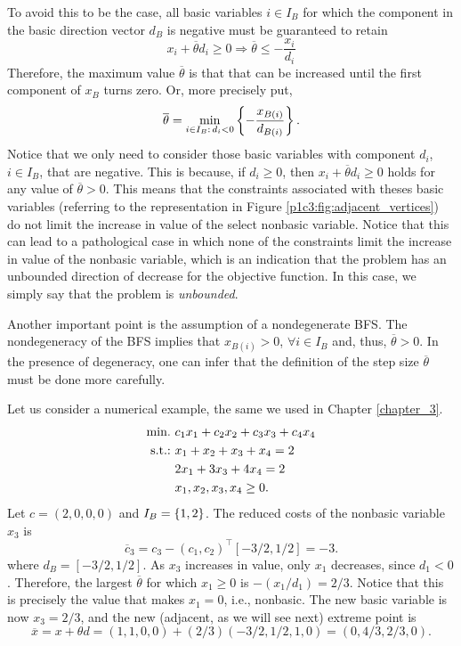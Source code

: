 To avoid this to be the case, all basic variables $i \in I_B$ for which the component in the basic direction vector $d_B$ is negative must be guaranteed to retain
%
\begin{equation*}
	x_i + \overline{\theta}d_i \geq 0 \Rightarrow \overline{\theta} \leq -\frac{x_i}{d_i}
\end{equation*}
%
Therefore, the maximum value $\overline{\theta}$ is that that can be increased until the first component of $x_B$ turns zero. Or, more precisely put, 
%
\begin{equation*}
	\overline{\theta} = \min_{i \in I_B : \, d_i < 0} \left\{ -\frac{x_{B(i)}}{d_{B(i)}} \right \}.
\end{equation*}
%
Notice that we only need to consider those basic variables with component $d_i$, $i \in I_B$, that are negative. This is because, if $d_i \ge 0$, then $x_i + \overline{\theta}d_i \geq 0$ holds for any value of $\overline{\theta} > 0$. This means that the constraints associated with theses basic variables (referring to the representation in Figure \ref{p1c3:fig:adjacent_vertices}) do not limit the increase in value of the select nonbasic variable. Notice that this can lead to a pathological case in which none of the constraints limit the increase in value of the nonbasic variable, which is an indication that the problem has an unbounded direction of decrease for the objective function. In this case, we simply say that the problem is \emph{unbounded}.

Another important point is the assumption of a nondegenerate BFS. The nondegeneracy of the BFS implies that  $x_{B(i)} > 0$, $\forall i \in I_B$ and, thus, $\overline{\theta} > 0$. In the presence of degeneracy, one can infer that the definition of the step size $\overline{\theta}$ must be done more carefully.

Let us consider a numerical example, the same we used in Chapter \ref{chapter_3}. 
%
\begin{align*}
	\mathop{\text{min.~}} & c_1x_1 + c_2x_2 + c_3x_3 + c_4x_4 \\	
	\mathop{\text{s.t.:~}} & x_1 + x_2 + x_3 + x_4 = 2 \\
	& 2x_1 + 3x_3 + 4x_4 = 2 \\
	& x_1, x_2 ,x_3, x_4 \geq 0.  
\end{align*}
%
Let $c = (2,0,0,0)$ and $I_B=\left\{ 1,2 \right \} $. The reduced costs of the nonbasic variable $x_3$ is 
%
\begin{equation*}
	\overline{c}_3 = c_3 - (c_1, c_2)^\top [-3/2, 1/2] = -3.	
\end{equation*}
%
where $d_B = [-3/2, 1/2]$. As $x_3$ increases in value, only $x_1$ decreases, since $d_1 < 0$. Therefore, the largest $\overline{\theta}$ for which $x_1\geq 0$ is $-(x_1/d_1)= 2/3$. Notice that this is precisely the value that makes $x_1 = 0$, i.e., nonbasic. The new basic variable is now $x_3 = 2/3$, and the new (adjacent, as we will see next) extreme point is 
%
\begin{equation*}
	\overline{x} = x + \theta d = (1,1,0,0) + (2/3)(-3/2, 1/2, 1, 0) = (0,4/3,2/3,0).	
\end{equation*}



